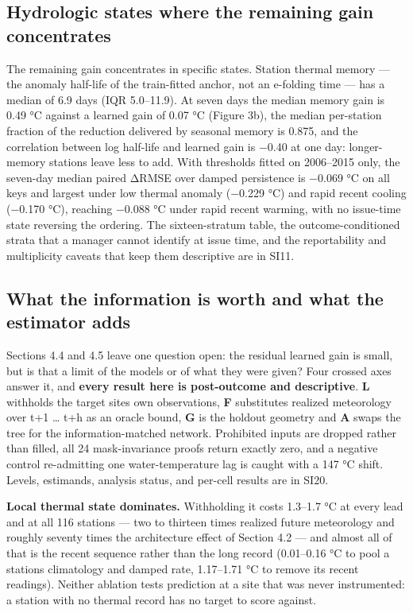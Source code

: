 \subsection{Hydrologic states where the remaining gain concentrates}\label{hydrologic-states-where-the-remaining-gain-concentrates}

The remaining gain concentrates in specific states. Station thermal memory --- the
anomaly half-life of the train-fitted anchor, not an e-folding time --- has a
median of 6.9 days (IQR 5.0--11.9). At seven days the median memory gain is
0.49 °C against a learned gain of 0.07 °C (Figure 3b), the median per-station
fraction of the reduction delivered by seasonal memory is 0.875, and the
correlation between log half-life and learned gain is −0.40 at one day:
longer-memory stations leave less to add. With thresholds fitted on 2006--2015
only, the seven-day median paired ΔRMSE over damped persistence is −0.069 °C on
all keys and largest under low thermal anomaly (−0.229 °C) and rapid recent
cooling (−0.170 °C), reaching −0.088 °C under rapid recent warming, with no
issue-time state reversing the ordering. The sixteen-stratum table, the
outcome-conditioned strata that a manager cannot identify at issue time, and the
reportability and multiplicity caveats that keep them descriptive are in SI11.

\subsection{What the information is worth and what the estimator adds}\label{what-the-information-is-worth-and-what-the-estimator-adds}

Sections 4.4 and 4.5 leave one question open: the residual learned gain is
small, but is that a limit of the models or of what they were given? Four
crossed axes answer it, and \textbf{every result here is post-outcome and
descriptive}. \textbf{L} withholds the target site\textquotesingle s own observations, \textbf{F}
substitutes realized meteorology over t+1 \ldots{} t+h as an oracle bound, \textbf{G} is the
holdout geometry and \textbf{A} swaps the tree for the information-matched network.
Prohibited inputs are dropped rather than filled, all 24 mask-invariance proofs
return exactly zero, and a negative control re-admitting one water-temperature
lag is caught with a 147 °C shift. Levels, estimands, analysis status, and
per-cell results are in SI20.

\textbf{Local thermal state dominates.} Withholding it costs 1.3--1.7 °C at every lead
and at all 116 stations --- two to thirteen times realized future meteorology and
roughly seventy times the architecture effect of Section 4.2 --- and almost all of
that is the recent sequence rather than the long record (0.01--0.16 °C to pool a
station\textquotesingle s climatology and damped rate, 1.17--1.71 °C to remove its recent
readings). Neither ablation tests prediction at a site that was never
instrumented: a station with no thermal record has no target to score against.

